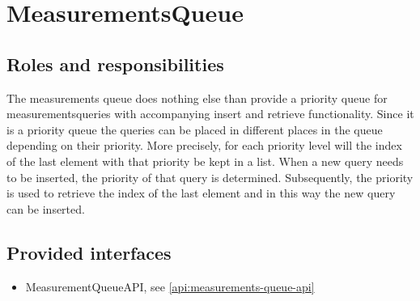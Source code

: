 \section{MeasurementsQueue}
\label{element:measurements-queue}

\subsection{Roles and responsibilities}

\npar The measurements queue does nothing else than provide a priority queue for
measurementsqueries with accompanying insert and retrieve functionality. Since
it is a priority queue the queries can be placed in different places in the
queue depending on their priority. More precisely, for each priority level will
the index of the last element with that priority be kept in a list. When a new
query needs to be inserted, the priority of that query is determined.
Subsequently, the priority is used to retrieve the index of the last element and
in this way the new query can be inserted.

\subsection{Provided interfaces}

\begin{itemize}
  \item MeasurementQueueAPI, see \ref{api:measurements-queue-api}
\end{itemize}